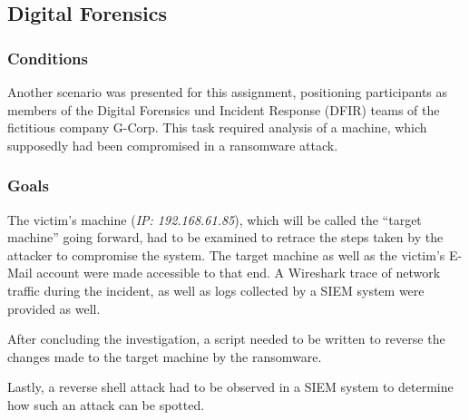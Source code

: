\documentclass[../report.tex]{subfiles}
\begin{document}
\subsection{Digital Forensics}

\subsubsection{Conditions}
Another scenario was presented for this assignment, positioning participants as members of the Digital Forensics und Incident Response (DFIR) teams of the fictitious company G-Corp.
This task required analysis of a machine, which supposedly had been compromised in a ransomware attack. 

\subsubsection{Goals}
The victim's machine (\textit{IP: 192.168.61.85}), which will be called the \enquote{target machine} going forward, had to be examined to retrace the steps taken by the attacker to compromise the system.
The target machine as well as the victim's E-Mail account were made accessible to that end.
A Wireshark trace of network traffic during the incident, as well as logs collected by a SIEM system were provided as well.

After concluding the investigation, a script needed to be written to reverse the changes made to the target machine by the ransomware.

Lastly, a reverse shell attack had to be observed in a SIEM system to determine how such an attack can be spotted.
\end{document}

